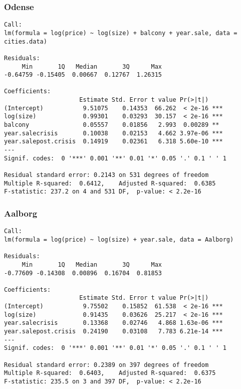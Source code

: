 \subsubsection{Odense}
\begin{lstlisting}
Call:
lm(formula = log(price) ~ log(size) + balcony + year.sale, data = cities.data)

Residuals:
     Min       1Q   Median       3Q      Max 
-0.64759 -0.15405  0.00667  0.12767  1.26315 

Coefficients:
                     Estimate Std. Error t value Pr(>|t|)    
(Intercept)           9.51075    0.14353  66.262  < 2e-16 ***
log(size)             0.99301    0.03293  30.157  < 2e-16 ***
balcony               0.05557    0.01856   2.993  0.00289 ** 
year.salecrisis       0.10038    0.02153   4.662 3.97e-06 ***
year.salepost.crisis  0.14919    0.02361   6.318 5.60e-10 ***
---
Signif. codes:  0 '***' 0.001 '**' 0.01 '*' 0.05 '.' 0.1 ' ' 1

Residual standard error: 0.2143 on 531 degrees of freedom
Multiple R-squared:  0.6412,	Adjusted R-squared:  0.6385 
F-statistic: 237.2 on 4 and 531 DF,  p-value: < 2.2e-16
\end{lstlisting}

\subsubsection{Aalborg}
\begin{lstlisting}
Call:
lm(formula = log(price) ~ log(size) + year.sale, data = Aalborg)

Residuals:
     Min       1Q   Median       3Q      Max 
-0.77609 -0.14308  0.00896  0.16704  0.81853 

Coefficients:
                     Estimate Std. Error t value Pr(>|t|)    
(Intercept)           9.75502    0.15852  61.538  < 2e-16 ***
log(size)             0.91435    0.03626  25.217  < 2e-16 ***
year.salecrisis       0.13368    0.02746   4.868 1.63e-06 ***
year.salepost.crisis  0.24190    0.03108   7.783 6.21e-14 ***
---
Signif. codes:  0 '***' 0.001 '**' 0.01 '*' 0.05 '.' 0.1 ' ' 1

Residual standard error: 0.2389 on 397 degrees of freedom
Multiple R-squared:  0.6403,	Adjusted R-squared:  0.6375 
F-statistic: 235.5 on 3 and 397 DF,  p-value: < 2.2e-16
\end{lstlisting}